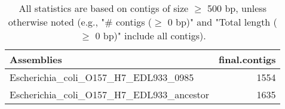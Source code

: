\documentclass[12pt,a4paper]{article}
\begin{document}
\begin{table}[ht]
\begin{center}
\caption{All statistics are based on contigs of size $\geq$ 500 bp, unless otherwise noted (e.g., "\# contigs ($\geq$ 0 bp)" and "Total length ($\geq$ 0 bp)" include all contigs).}
\begin{tabular}{|l*{1}{|r}|}
\hline
Assemblies & final.contigs \\ \hline
Escherichia\_coli\_O157\_H7\_EDL933\_0985 & 1554 \\ \hline
Escherichia\_coli\_O157\_H7\_EDL933\_ancestor & 1635 \\ \hline
\end{tabular}
\end{center}
\end{table}
\end{document}
